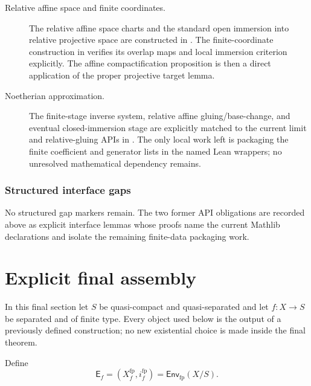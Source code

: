 \begin{description}
  \item[Relative affine space and finite coordinates.]  The relative affine
    space charts and the standard open immersion into relative projective
    space are constructed in
    .  The finite-coordinate
    construction in
     verifies its
    overlap maps and local immersion criterion explicitly.  The affine
    compactification proposition is then a direct application of the proper
    projective target lemma.

  \item[Noetherian approximation.]  The finite-stage inverse system,
    relative affine gluing/base-change, and eventual closed-immersion stage
    are explicitly matched to the current limit and relative-gluing APIs in
    .  The only local work left is
    packaging the finite coefficient and generator lists in the named Lean
    wrappers; no unresolved mathematical dependency remains.
\end{description}

\subsubsection{Structured interface gaps}

No structured gap markers remain.  The two former API obligations are
recorded above as explicit interface lemmas whose proofs name the current
Mathlib declarations and isolate the remaining finite-data packaging work.

\section{Explicit final assembly}

In this final section let $S$ be quasi-compact and quasi-separated and let
$f\colon X\to S$ be separated and of finite type.  Every object used below is
the output of a previously defined construction; no new existential choice is
made inside the final theorem.

\begin{definition}
  \label{def:nagata-final-fp-envelope}

  Define
  \[
    \mathsf E_f=(X_f^{\mathrm{fp}},i_f^{\mathrm{fp}})
      =\mathsf{Env}_{\mathrm{fp}}(X/S).
  \]
\end{definition}

